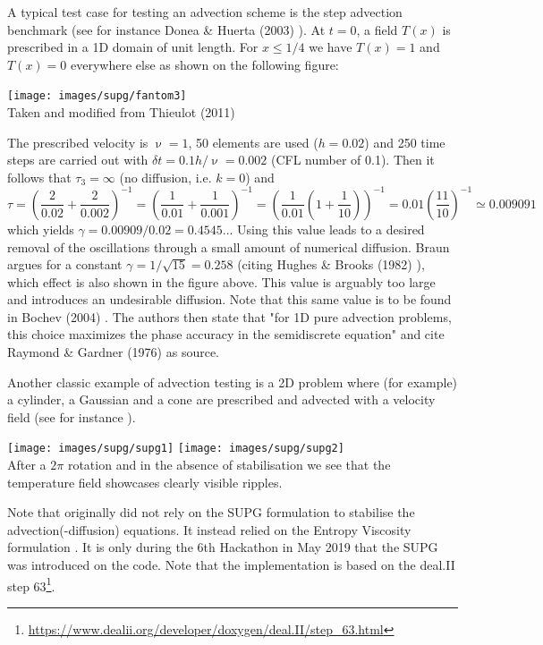 A typical test case for testing an advection scheme is the step advection benchmark 
(see for instance Donea \& Huerta (2003) \cite{dohu03}). At $t=0$, 
a field $T(x)$ is prescribed in a 1D domain of unit length. For $x\le 1/4$ we have $T(x)=1$ and 
$T(x)=0$ everywhere else as shown on the following figure:
\begin{center}
\texttt{[image: images/supg/fantom3]}\\
{\captionfont Taken and modified from Thieulot (2011) \cite{thie11}}
\end{center}
The prescribed velocity is $\upnu=1$, 50 elements are used ($h=0.02$) and 250 time steps are 
carried out with $\delta t=0.1h/\upnu=0.002$ (CFL number of 0.1).
Then it follows that $\tau_3=\infty$ (no diffusion, i.e. $k=0$) and 
\[
\tau
= \left(\frac{2}{0.02} + \frac{2}{0.002} \right)^{-1}
= \left(\frac{1}{0.01} + \frac{1}{0.001} \right)^{-1}
= \left(\frac{1}{0.01} (1 + \frac{1}{10})  \right)^{-1}
= 0.01 \left(\frac{11}{10}  \right)^{-1}
\simeq 0.009091
\]
which yields $\gamma = 0.00909/0.02=0.4545...$
Using this value leads to a desired removal of the oscillations through a small
amount of numerical diffusion. Braun \cite{brau03} argues for a constant
$\gamma=1/\sqrt{15}=0.258$ (citing Hughes \& Brooks (1982) \cite{hubr82}), 
which effect is also shown in the figure above. This 
value is arguably too large and introduces an undesirable diffusion. Note that this same value is 
to be found in Bochev \etal (2004) \cite{bogs04}. The authors then state that 
"for 1D pure advection problems, this choice maximizes the phase accuracy in the semidiscrete
equation" and cite Raymond \& Gardner (1976) \cite{raga76} as source. 

Another classic example of advection testing is a 2D problem where (for example) a cylinder, a Gaussian 
and a cone are prescribed and advected with a velocity field (see for instance \cite{dohu03}). 

\begin{center}
\texttt{[image: images/supg/supg1]}
\texttt{[image: images/supg/supg2]}\\
{\captionfont After a $2\pi$ rotation and in the absence of stabilisation we see that the temperature field
showcases clearly visible ripples.}
\end{center}

\begin{remark}
Note that \aspect{} originally did not rely on the SUPG formulation to stabilise the 
advection(-diffusion) equations\cite{krhb12}. It instead relied on the Entropy Viscosity
formulation \cite{gupp10,gupp11}.
It is only during the 6th Hackathon in May 2019 that the SUPG was introduced on the code.
Note that the \aspect{} implementation is based on the deal.II step 
63\footnote{\url{https://www.dealii.org/developer/doxygen/deal.II/step_63.html}}.
\end{remark}





